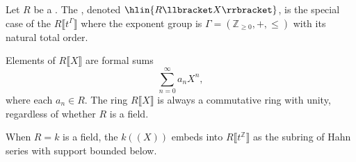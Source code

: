 \begin{definition} \label{definition:formal_power_series_ring_in_one_variable_over_a_commutative_ring}
Let $R$ be a . The , denoted $\hlin{R \llbracket X \rrbracket}$, is the special case of the  $R \llbracket t^\Gamma \rrbracket$ where the exponent group is $\Gamma = (\mathbb{Z}_{\geq 0}, +, \leq)$ with its natural total order.

Elements of $R \llbracket X \rrbracket$ are formal sums
$$\sum_{n=0}^{\infty} a_n X^n,$$
where each $a_n \in R$. The ring $R \llbracket X \rrbracket$ is always a commutative ring with unity, regardless of whether $R$ is a field.

When $R = k$ is a field, the  $k((X))$ embeds into $R \llbracket t^{\mathbb{Z}} \rrbracket$ as the subring of Hahn series with support bounded below.
\end{definition}
